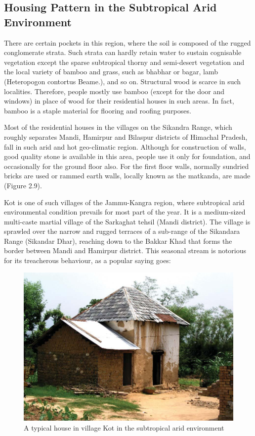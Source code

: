 \subsection*{Housing Pattern in the Subtropical Arid Environment}

There are certain pockets in this region, where the soil is composed of the rugged conglomerate strata. Such strata can hardly retain water to sustain cognisable vegetation except the sparse subtropical thorny and semi-desert vegetation and the local variety of bamboo and grass, such as bhabhar or bagar, lamb (Heteropogon contortus Beame.), and so on. Structural wood is scarce in such localities. Therefore, people mostly use bamboo (except for the door and windows) in place of wood for their residential houses in such areas. In fact, bamboo is a staple material for flooring and roofing purposes.

Most of the residential houses in the villages on the Sikandra Range, which roughly separates Mandi, Hamirpur and Bilaspur districts of Himachal Pradesh, fall in such arid and hot geo-climatic region. Although for construction of walls, good quality stone is available in this area, people use it only for foundation, and occasionally for the ground floor also. For the first floor walls, normally sundried bricks are used or rammed earth walls, locally known as the matkanda, are made (Figure 2.9).

Kot is one of such villages of the Jammu-Kangra region, where subtropical arid environmental condition prevails for most part of the year. It is a medium-sized multi-caste martial village of the Sarkaghat tehsil (Mandi district). The village is sprawled over the narrow and rugged terraces of a sub-range of the Sikandara Range (Sikandar Dhar), reaching down to the Bakkar Khad that forms the border between Mandi and Hamirpur district. This seasonal stream is notorious for its treacherous behaviour, as a popular saying goes:

\begin{figure}[!htbp]
\includegraphics[scale=.3]{images/chap02-09.jpg}
\caption{A typical house in village Kot in the subtropical arid environment}\label{chap02-fig09}
\end{figure}

